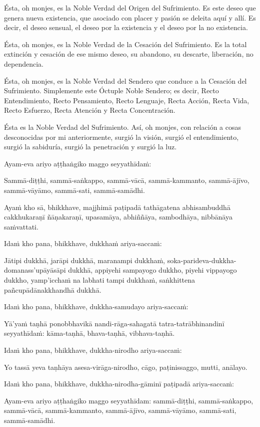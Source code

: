 Ésta, oh monjes, es la Noble Verdad del Origen del Sufrimiento. Es este deseo que genera nueva existencia, que asociado con placer y pasión se deleita aquí y allí. Es decir, el deseo sensual, el deseo por la existencia y el deseo por la no existencia.

Ésta, oh monjes, es la Noble Verdad de la Cesación del Sufrimiento. Es la total extinción y cesación de ese mismo deseo, su abandono, su descarte, liberación, no dependencia.

Ésta, oh monjes, es la Noble Verdad del Sendero que conduce a la Cesación del Sufrimiento. Simplemente este Óctuple Noble Sendero; es decir, Recto Entendimiento, Recto Pensamiento, Recto Lenguaje, Recta Acción, Recta Vida, Recto Esfuerzo, Recta Atención y Recta Concentración.

Ésta es la Noble Verdad del Sufrimiento. Así, oh monjes, con relación a cosas desconocidas por mi anteriormente, surgió la visión, surgió el entendimiento, surgió la sabiduría, surgió la penetración y surgió la luz.

\clearpage

\paliText
\markboth{\paliTitle}{\rightmark}

Ayam-eva ariyo aṭṭhaṅgiko maggo seyyathīdaṁ:

Sammā-diṭṭhi, sammā-saṅkappo, sammā-vācā, sammā-kammanto, sammā-ājīvo,
sammā-vāyāmo, sammā-sati, sammā-samādhi.

Ayaṁ kho sā, bhikkhave, majjhimā paṭipadā tathāgatena abhisambuddhā
cakkhukaraṇī ñāṇakaraṇī, upasamāya, abhiññāya, sambodhāya, nibbānāya
saṁvattati.

Idaṁ kho pana, bhikkhave, dukkhaṁ ariya-saccaṁ:

Jātipi dukkhā, jarāpi dukkhā, maranampi dukkhaṁ,
soka-parideva-dukkha-domanass'upāyāsāpi dukkhā, appiyehi sampayogo
dukkho, piyehi vippayogo dukkho, yamp'icchaṁ na labhati tampi dukkhaṁ,
saṅkhittena pañcupādānakkhandhā dukkhā.

Idaṁ kho pana, bhikkhave, dukkha-samudayo ariya-saccaṁ:

Yā'yaṁ taṇhā ponobbhavikā nandi-rāga-sahagatā tatra-tatrābhinandinī
seyyathīdaṁ: kāma-taṇhā, bhava-taṇhā, vibhava-taṇhā.

Idaṁ kho pana, bhikkhave, dukkha-nirodho ariya-saccaṁ:

Yo tassā yeva taṇhāya asesa-virāga-nirodho, cāgo, paṭinissaggo, mutti,
anālayo.

Idaṁ kho pana, bhikkhave, dukkha-nirodha-gāminī paṭipadā ariya-saccaṁ:

Ayam-eva ariyo aṭṭhaṅgiko maggo seyyathīdam: sammā-diṭṭhi,
sammā-saṅkappo, sammā-vācā, sammā-kammanto, sammā-ājīvo, sammā-vāyāmo,
sammā-sati, sammā-samādhi.

